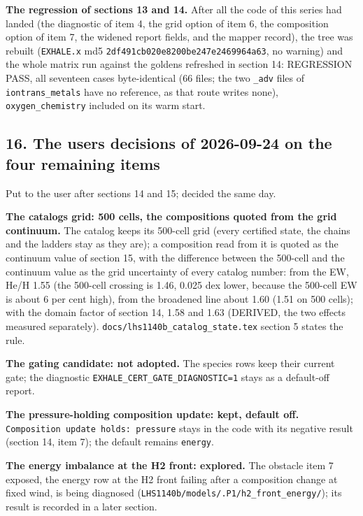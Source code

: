 \documentclass[english,a4paper]{my_memo}
\begin{document}
\textbf{The regression of sections 13 and 14.} After all the code of this series
had landed (the diagnostic of item 4, the grid option of item 6, the
composition option of item 7, the widened report fields, and the mapper
record), the tree was rebuilt (\texttt{EXHALE.x} md5
\texttt{2df491cb020e8200be247e2469964a63}, no warning) and the whole matrix run
against the goldens refreshed in section 14: REGRESSION PASS, all seventeen
cases byte-identical (66 files; the two \texttt{\_adv} files of \texttt{iontrans\_metals} have
no reference, as that route writes none), \texttt{oxygen\_chemistry} included on its
warm start.

\subsection{16. The user\textquotesingle s decisions of 2026-09-24 on the four remaining items}\label{16-the-users-decisions-of-2026-09-24-on-the-four-remaining-items}

Put to the user after sections 14 and 15; decided the same day.

\textbf{The catalog\textquotesingle s grid: 500 cells, the compositions quoted from the grid
continuum.} The catalog keeps its 500-cell grid (every certified state, the
chains and the ladders stay as they are); a composition read from it is
quoted as the continuum value of section 15, with the difference between the
500-cell and the continuum value as the grid uncertainty of every catalog
number: from the EW, He/H 1.55 (the 500-cell crossing is 1.46, 0.025 dex
lower, because the 500-cell EW is about 6 per cent high), from the broadened
line about 1.60 (1.51 on 500 cells); with the domain factor of section 14, 1.58 and 1.63 (DERIVED, the two
effects measured separately). \texttt{docs/lhs1140b\_catalog\_state.tex} section 5
states the rule.

\textbf{The gating candidate: not adopted.} The species rows keep their current
gate; the diagnostic \texttt{EXHALE\_CERT\_GATE\_DIAGNOSTIC=1} stays as a default-off
report.

\textbf{The pressure-holding composition update: kept, default off.} \texttt{Composition\ update\ holds:\ pressure} stays in the code with its negative result (section
14, item 7); the default remains \texttt{energy}.

\textbf{The energy imbalance at the H2 front: explored.} The obstacle item 7
exposed, the energy row at the H2 front failing after a composition change at
fixed wind, is being diagnosed (\texttt{LHS1140b/models/.P1/h2\_front\_energy/}); its
result is recorded in a later section.
\end{document}
